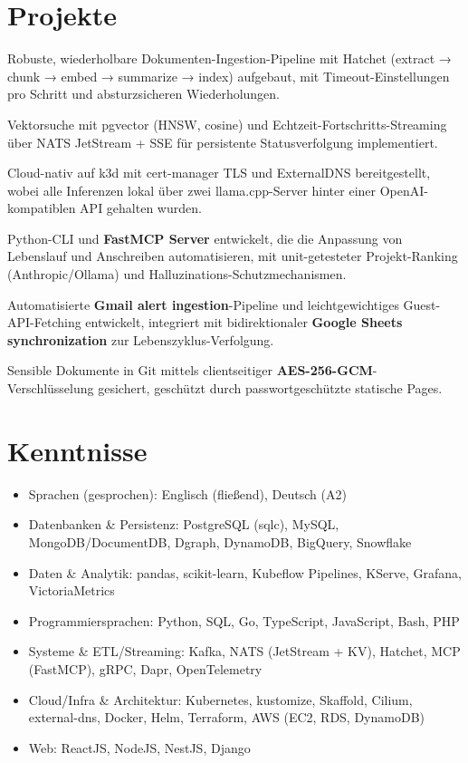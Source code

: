 \documentclass[10pt,a4paper]{resume}
\begin{document}
\section{Projekte}

\bullets
  \item Robuste, wiederholbare Dokumenten-Ingestion-Pipeline mit Hatchet (extract → chunk → embed → summarize → index) aufgebaut, mit Timeout-Einstellungen pro Schritt und absturzsicheren Wiederholungen.
  \item Vektorsuche mit pgvector (HNSW, cosine) und Echtzeit-Fortschritts-Streaming über NATS JetStream + SSE für persistente Statusverfolgung implementiert.
  \item Cloud-nativ auf k3d mit cert-manager TLS und ExternalDNS bereitgestellt, wobei alle Inferenzen lokal über zwei llama.cpp-Server hinter einer OpenAI-kompatiblen API gehalten wurden.
\bulletsend
\vspace{1.0pt}
\bullets
  \item Python-CLI und \textbf{FastMCP Server} entwickelt, die die Anpassung von Lebenslauf und Anschreiben automatisieren, mit unit-getesteter Projekt-Ranking (Anthropic/Ollama) und Halluzinations-Schutzmechanismen.
  \item Automatisierte \textbf{Gmail alert ingestion}-Pipeline und leichtgewichtiges Guest-API-Fetching entwickelt, integriert mit bidirektionaler \textbf{Google Sheets synchronization} zur Lebenszyklus-Verfolgung.
  \item Sensible Dokumente in Git mittels clientseitiger \textbf{AES-256-GCM}-Verschlüsselung gesichert, geschützt durch passwortgeschützte statische Pages.
\bulletsend

\section{Kenntnisse}

\begin{itemize}[leftmargin=1.4em,nosep,topsep=2pt]
  \item Sprachen (gesprochen): Englisch (fließend), Deutsch (A2)
  \item Datenbanken \& Persistenz: PostgreSQL (sqlc), MySQL, MongoDB/DocumentDB, Dgraph, DynamoDB, BigQuery, Snowflake
  \item Daten \& Analytik: pandas, scikit-learn, Kubeflow Pipelines, KServe, Grafana, VictoriaMetrics
  \item Programmiersprachen: Python, SQL, Go, TypeScript, JavaScript, Bash, PHP
  \item Systeme \& ETL/Streaming: Kafka, NATS (JetStream + KV), Hatchet, MCP (FastMCP), gRPC, Dapr, OpenTelemetry
  \item Cloud/Infra \& Architektur: Kubernetes, kustomize, Skaffold, Cilium, external-dns, Docker, Helm, Terraform, AWS (EC2, RDS, DynamoDB)
  \item Web: ReactJS, NodeJS, NestJS, Django
\end{itemize}
\end{document}
